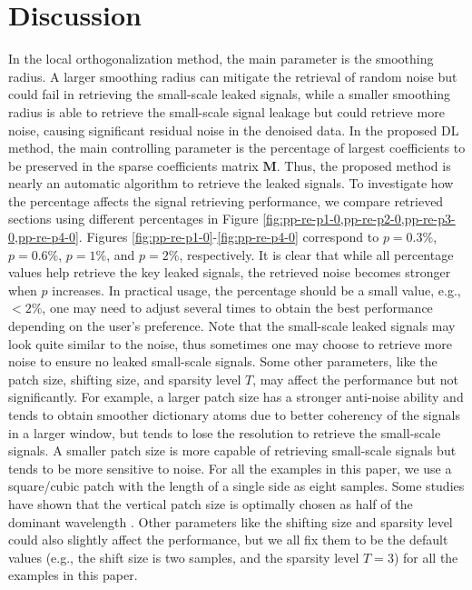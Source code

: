 \section{Discussion}
In the local orthogonalization method, the main parameter is the smoothing radius. A larger smoothing radius can mitigate the retrieval of random noise but could fail in retrieving the small-scale leaked signals, while a smaller smoothing radius is able to retrieve the small-scale signal leakage but could retrieve more noise, causing significant residual noise in the denoised data. In the proposed DL method, the main controlling parameter is the percentage of largest coefficients to be preserved in the sparse coefficients matrix $\mathbf{M}$. Thus, the proposed method is nearly an automatic algorithm to retrieve the leaked signals. To investigate how the percentage affects the signal retrieving performance, we compare retrieved sections using different percentages in Figure \ref{fig:pp-re-p1-0,pp-re-p2-0,pp-re-p3-0,pp-re-p4-0}. Figures \ref{fig:pp-re-p1-0}-\ref{fig:pp-re-p4-0} correspond to $p=0.3\%$, $p=0.6\%$, $p=1\%$, and $p=2\%$, respectively. It is clear that while all percentage values help retrieve the key leaked signals, the retrieved noise becomes stronger when $p$ increases. In practical usage, the percentage should be a small value, e.g., $<2\%$, one may need to adjust several times to obtain the best performance depending on the user's preference. Note that the small-scale leaked signals may look quite similar to the noise, thus sometimes one may choose to retrieve more noise to ensure no leaked small-scale signals. Some other parameters, like the patch size, shifting size, and sparsity level $T$, may affect the performance but not significantly. For example, a larger patch size has a stronger anti-noise ability and tends to obtain smoother dictionary atoms due to better coherency of the signals in a larger window, but tends to lose the resolution to retrieve the small-scale signals. A smaller patch size is more capable of retrieving small-scale signals but tends to be more sensitive to noise. For all the examples in this paper, we use a square/cubic patch with the length of a single side as eight samples. Some studies have shown that the vertical patch size is optimally chosen as half of the dominant wavelength \cite[]{guoyin2018,wanghang2020}. Other parameters like the shifting size and sparsity level could also slightly affect the performance, but we all fix them to be the default values (e.g., the shift size is two samples, and the sparsity level $T=3$) for all the examples in this paper. 

